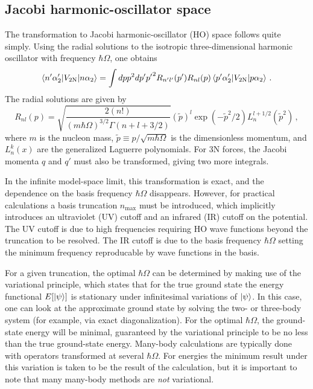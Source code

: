 \subsection{Jacobi harmonic-oscillator space}

The transformation to Jacobi harmonic-oscillator (HO) space follows quite simply.
Using the radial solutions to the isotropic three-dimensional harmonic oscillator with frequency $\hbar \Omega$,
one obtains
\begin{equation}\label{eq:jacobi_ho_twobody}
  \braket{n' \alpha_{2}^{\prime}|V_{2\text{N}}|n \alpha_2} = \int dp p^2 dp' {p'}^2 R_{n'l'}(p') R_{nl}(p)
  \braket{p' \alpha_{2}^{\prime}|V_{2\text{N}}|p \alpha_2}\,.
\end{equation}
The radial solutions are given by
\begin{equation}
  R_{n l}(p) = \sqrt{\frac{2(n!)}{{(m \hbar \Omega)}^{3/2} \Gamma(n + l + 3/2)}}
  {\left(\widetilde{p}\right)}^{l}
  \exp(- \widetilde{p}^2/2)
  L^{l + 1/2}_{n}\left(\widetilde{p}^2\right)\,,
\end{equation}
where $m$ is the nucleon mass, $\widetilde{p} \equiv p/\sqrt{m \hbar \Omega}$ is the dimensionless momentum,
and $L_{n}^{k}(x)$ are the generalized Laguerre polynomials.
For 3N forces, the Jacobi momenta $q$ and $q'$ must also be transformed, giving two more integrals.

In the infinite model-space limit, this transformation is exact,
and the dependence on the basis frequency $\hbar \Omega$ disappears.
However, for practical calculations a basis truncation $n_{\text{max}}$ must be introduced,
which implicitly introduces an ultraviolet (UV) cutoff and an infrared (IR) cutoff on the potential.
The UV cutoff is due to high frequencies requiring HO wave functions beyond the truncation to be resolved.
The IR cutoff is due to the basis frequency $\hbar \Omega$ setting the minimum frequency reproducable by wave functions in the basis.

For a given truncation,
the optimal $\hbar \Omega$ can be determined by making use of the variational principle,
which states that for the true ground state
the energy functional $E[\ket{\psi}]$ is stationary
under infinitesimal variations of $\ket{\psi}$.
In this case, one can look at the approximate ground state by solving
the two- or three-body system (for example, via exact diagonalization).
For the optimal $\hbar \Omega$, the ground-state energy will be minimal,
guaranteed by the variational principle to be no less than the true ground-state energy.
Many-body calculations are typically done with operators transformed
at several $\hbar \Omega$.
For energies the minimum result under this variation
is taken to be the result of the calculation,
but it is important to note that many many-body methods are \textit{not} variational.

